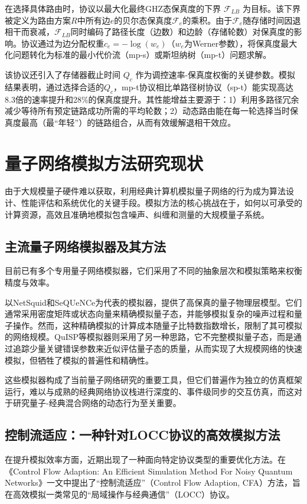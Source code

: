 在选择具体路由时，协议以最大化最终GHZ态保真度的下界 $\mathcal{F}_{LB}$ 为目标。该下界被定义为路由方案$R$中所有边$e$的贝尔态保真度$\mathcal{F}_e$的乘积。由于$\mathcal{F}_e$随存储时间因退相干而衰减，$\mathcal{F}_{LB}$同时编码了路径长度（边数）和边龄（存储轮数）对保真度的影响。协议通过为边分配权重$c_e = -\log(w_e)$（$w_e$为Werner参数），将保真度最大化问题转化为标准的最小代价流（mp-s）或斯坦纳树（mp-t）问题求解。

该协议还引入了存储器截止时间 $Q_c$ 作为调控速率-保真度权衡的关键参数。模拟结果表明，通过选择合适的$Q_c$，mp-t协议相比单路径树协议（sp-t）能实现高达8.3倍的速率提升和28\%的保真度提升。其性能增益主要源于：1）利用多路径冗余减少等待所有预定链路成功所需的平均轮数；2）动态路由能在每一轮选择当时保真度最高（最“年轻”）的链路组合，从而有效缓解退相干效应。

\section{量子网络模拟方法研究现状}
由于大规模量子硬件难以获取，利用经典计算机模拟量子网络的行为成为算法设计、性能评估和系统优化的关键手段。模拟方法的核心挑战在于，如何以可承受的计算资源，高效且准确地模拟包含噪声、纠缠和测量的大规模量子系统。

\subsection{主流量子网络模拟器及其方法}
目前已有多个专用量子网络模拟器，它们采用了不同的抽象层次和模拟策略来权衡精度与效率。

以NetSquid和SeQUeNCe为代表的模拟器，提供了高保真的量子物理层模型。它们通常采用密度矩阵或状态向量来精确模拟量子态，并能够模拟复杂的噪声过程和量子操作。然而，这种精确模拟的计算成本随量子比特数指数增长，限制了其可模拟的网络规模。QuISP等模拟器则采用了另一种思路，它不完整模拟量子态，而是通过追踪少量关键错误参数来近似评估量子态的质量，从而实现了大规模网络的快速模拟，但牺牲了模拟的普遍性和精确性。

这些模拟器构成了当前量子网络研究的重要工具，但它们普遍作为独立的仿真框架运行，难以与成熟的经典网络协议栈进行深度的、事件级同步的交互仿真，而这对于研究量子-经典混合网络的动态行为至关重要。

\subsection{控制流适应：一种针对LOCC协议的高效模拟方法}
在提升模拟效率方面，近期出现了一种面向特定协议类型的重要优化方法。\cite{lin2024controlflowadaptionefficient}在《Control Flow Adaption: An Efficient Simulation Method For Noisy Quantum Networks》一文中提出了“控制流适应”（Control Flow Adaption, CFA）方法，旨在高效模拟一类常见的“局域操作与经典通信”（LOCC）协议。

